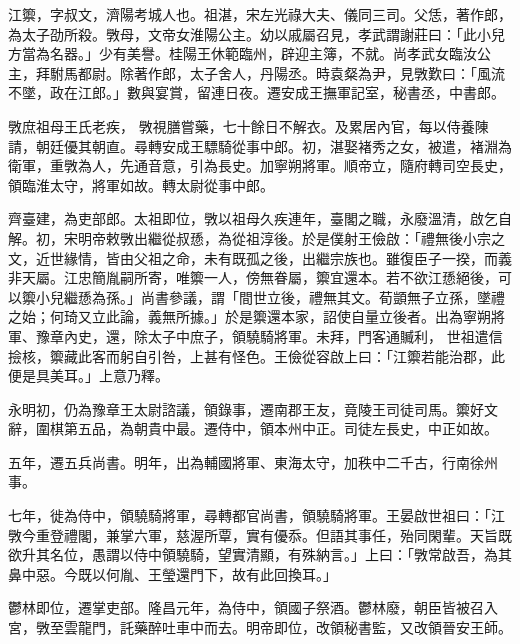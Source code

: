 
\begin{pinyinscope}

 江籞，字叔文，濟陽考城人也。祖湛，宋左光祿大夫、儀同三司。父恁，著作郎，為太子劭所殺。斆母，文帝女淮陽公主。幼以戚屬召見，孝武謂謝莊曰：「此小兒方當為名器。」少有美譽。桂陽王休範臨州，辟迎主簿，不就。尚孝武女臨汝公主，拜駙馬都尉。除著作郎，太子舍人，丹陽丞。時袁粲為尹，見斆歎曰：「風流不墜，政在江郎。」數與宴賞，留連日夜。遷安成王撫軍記室，秘書丞，中書郎。



 斆庶祖母王氏老疾，
 斆視膳嘗藥，七十餘日不解衣。及累居內官，每以侍養陳請，朝廷優其朝直。尋轉安成王驃騎從事中郎。初，湛娶褚秀之女，被遣，褚淵為衛軍，重斆為人，先通音意，引為長史。加寧朔將軍。順帝立，隨府轉司空長史，領臨淮太守，將軍如故。轉太尉從事中郎。



 齊臺建，為吏部郎。太祖即位，斆以祖母久疾連年，臺閣之職，永廢溫清，啟乞自解。初，宋明帝敕斆出繼從叔愻，為從祖淳後。於是僕射王儉啟：「禮無後小宗之文，近世緣情，皆由父祖之命，未有既孤之後，出繼宗族也。雖復臣子一揆，而義非天屬。江忠簡胤嗣所寄，唯籞一人，傍無眷屬，籞宜還本。若不欲江愻絕後，可以籞小兒繼愻為孫。」尚書參議，謂「間世立後，禮無其文。荀顗無子立孫，墜禮之始；何琦又立此論，義無所據。」於是籞還本家，詔使自量立後者。出為寧朔將軍、豫章內史，還，除太子中庶子，領驍騎將軍。未拜，門客通贓利，
 世祖遣信撿核，籞藏此客而躬自引咎，上甚有怪色。王儉從容啟上曰：「江籞若能治郡，此便是具美耳。」上意乃釋。



 永明初，仍為豫章王太尉諮議，領錄事，遷南郡王友，竟陵王司徒司馬。籞好文辭，圍棋第五品，為朝貴中最。遷侍中，領本州中正。司徒左長史，中正如故。



 五年，遷五兵尚書。明年，出為輔國將軍、東海太守，加秩中二千古，行南徐州事。



 七年，徙為侍中，領驍騎將軍，尋轉都官尚書，領驍騎將軍。王晏啟世祖曰：「江斆今重登禮閣，兼掌六軍，慈渥所覃，實有優忝。但語其事任，殆同閑輩。天旨既欲升其名位，愚謂以侍中領驍騎，望實清顯，有殊納言。」上曰：「斆常啟吾，為其鼻中惡。今既以何胤、王瑩還門下，故有此回換耳。」



 鬱林即位，遷掌吏部。隆昌元年，為侍中，領國子祭酒。鬱林廢，朝臣皆被召入宮，斆至雲龍門，託藥醉吐車中而去。明帝即位，改領秘書監，又改領晉安王師。




\end{pinyinscope}
